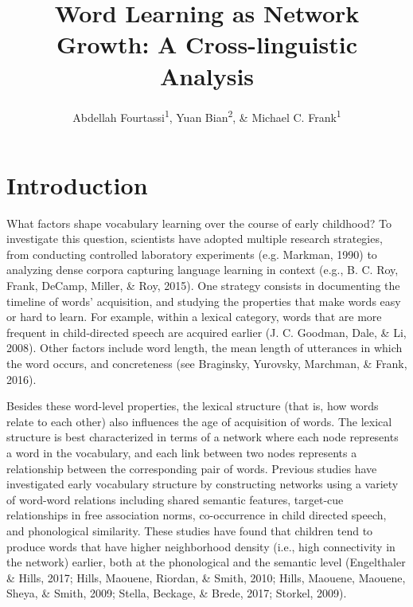 \documentclass[english,floatsintext,man]{apa6}
\title{Word Learning as Network Growth: A Cross-linguistic Analysis}
\author{Abdellah Fourtassi\textsuperscript{1}, Yuan Bian\textsuperscript{2}, \& Michael C. Frank\textsuperscript{1}}
\affiliation{
    \vspace{0.5cm}
          \textsuperscript{1} Department of Psychology, Stanford University\\
          \textsuperscript{2} Department of Psychology, University of Illinois  }
\theoremstyle{definition}
\theoremstyle{definition}
\theoremstyle{definition}
\theoremstyle{remark}
\begin{document}
\maketitle

\setcounter{secnumdepth}{0}



\section{Introduction}\label{introduction}

What factors shape vocabulary learning over the course of early
childhood? To investigate this question, scientists have adopted
multiple research strategies, from conducting controlled laboratory
experiments (e.g. Markman, 1990) to analyzing dense corpora capturing
language learning in context (e.g., B. C. Roy, Frank, DeCamp, Miller, \&
Roy, 2015). One strategy consists in documenting the timeline of words'
acquisition, and studying the properties that make words easy or hard to
learn. For example, within a lexical category, words that are more
frequent in child-directed speech are acquired earlier (J. C. Goodman,
Dale, \& Li, 2008). Other factors include word length, the mean length
of utterances in which the word occurs, and concreteness (see Braginsky,
Yurovsky, Marchman, \& Frank, 2016).

Besides these word-level properties, the lexical structure (that is, how
words relate to each other) also influences the age of acquisition of
words. The lexical structure is best characterized in terms of a network
where each node represents a word in the vocabulary, and each link
between two nodes represents a relationship between the corresponding
pair of words. Previous studies have investigated early vocabulary
structure by constructing networks using a variety of word-word
relations including shared semantic features, target-cue relationships
in free association norms, co-occurrence in child directed speech, and
phonological similarity. These studies have found that children tend to
produce words that have higher neighborhood density (i.e., high
connectivity in the network) earlier, both at the phonological and the
semantic level (Engelthaler \& Hills, 2017; Hills, Maouene, Riordan, \&
Smith, 2010; Hills, Maouene, Maouene, Sheya, \& Smith, 2009; Stella,
Beckage, \& Brede, 2017; Storkel, 2009).
\end{document}
